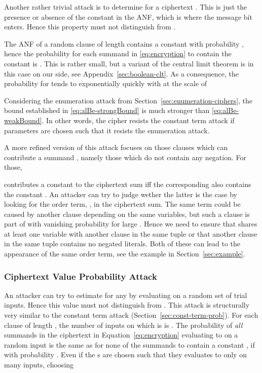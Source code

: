 \documentclass[final,journal,compsoc]{IEEEtran}
\begin{document}
Another rather trivial attack is to determine  for a
ciphertext . This is just the presence or absence of the constant
 in the ANF, which is where the message bit enters. Hence this
property must not distinguish  from .


The ANF of a random clause of length  contains a constant  with
probability , hence the probability for each summand in
\eqref{eq:encryption} to contain the constant  is
. This is rather small, but 
a variant of the central limit theorem is in this case on our
side,
see Appendix~\ref{sec:boolean-clt}.
As a consequence, the probability for  tends to 
exponentially quickly with  at the scale of

Considering the enumeration attack from
Section~\ref{sec:enumeration-ciphers}, the bound 
established in \eqref{eq:alBe-strongBound} is much stronger
than \eqref{eq:alBe-weakBound}. In other words, the
cipher resists the constant term
attack if parameters are chosen such that it resists the 
enumeration attack. 



A more refined version of this attack focuses on those clauses which
can contribute a summand , namely those  which do not contain
any negation. For those, 

contributes a constant to the ciphertext sum iff the corresponding 
also contains the constant .  An attacker can try to judge wether
the latter is the case by looking for the order  term,
, in the ciphertext sum.  The same term
could be caused by another clause depending on the same variables, but
such a clause is part of  with vanishing probability for large
. Hence we need to ensure that  shares at least one
variable with another clause in the same tuple or that another clause
in the same tuple contains no negated literals. Both of these can lead
to the appearance of the same order  term, see
the example in Section~\ref{sec:example}.


\subsubsection{Ciphertext Value Probability Attack\label{sec:ciph-value-prob}}

An attacker can try to estimate  for any  by
evaluating  on a random set of trial inputs. Hence this value must
not distinguish  from .  This attack is structurally very
similar to the constant term attack
(Section~\ref{sec:const-term-prob}). For each clause  of length
, the number of inputs on which  is  is . The probability of \emph{all} summands in the ciphertext  in
Equation~\eqref{eq:encryption} evaluating to  on a random input is
the same as for none of the summands to contain a constant , if
 with probability .  Even if the s are chosen
such that they evaluates to  only on  many
inputs, choosing
 
\end{document}
